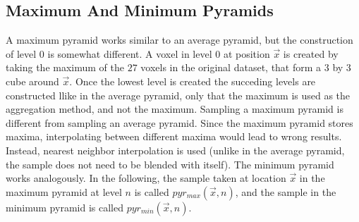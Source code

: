 {\subsection{Maximum And Minimum Pyramids}
A maximum pyramid works similar to an average pyramid, but the construction of level $0$ is somewhat different. A voxel in level $0$ at position $\vec{x}$ is created by taking the maximum of the $27$ voxels in the original dataset, that form a 3 by 3 cube around $\vec{x}$. Once the lowest level is created the succeding levels are constructed llike in the average pyramid, only that the maximum is used as the aggregation method, and not the maximum. Sampling a maximum pyramid is different from sampling an average pyramid. Since the maximum pyramid stores maxima, interpolating between different maxima would lead to wrong results. Instead, nearest neighbor interpolation is used (unlike in the average pyramid, the sample does not need to be blended with itself).
The minimum pyramid works analogously.
In the following, the sample taken at location $\vec{x}$ in the maximum pyramid at level $n$ is called $pyr_{max}(\vec{x}, n)$, and the sample in the minimum pyramid is called $pyr_{min}(\vec{x}, n)$.

}
